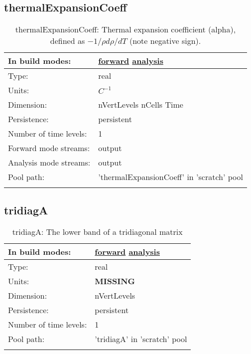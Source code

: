 \subsection[thermalExpansionCoeff]{thermalExpansionCoeff}
\label{subsec:var_sec_scratch_thermalExpansionCoeff}
\begin{center}
\begin{longtable}{| p{2.0in} | p{4.0in} |}
        \hline 
        In build modes: & \hyperref[subsec:forward_var_tab_scratch]{forward} \hyperref[subsec:analysis_var_tab_scratch]{analysis} \\
        \hline 
        Type: & real \\
        \hline 
        Units: & $C^{-1}$ \\
        \hline 
        Dimension: & nVertLevels nCells Time \\
        \hline 
        Persistence: & persistent \\
        \hline 
        Number of time levels: & 1 \\
        \hline 
		 Forward mode streams: &  output \\
        \hline 
		 Analysis mode streams: &  output \\
        \hline 
            Pool path: & 'thermalExpansionCoeff' in 'scratch' pool
 \\
		 \hline 
    \caption{thermalExpansionCoeff:  Thermal expansion coefficient (alpha), defined as  $-1/\rho d\rho/dT$  (note negative sign).}
\end{longtable}
\end{center}
\subsection[tridiagA]{tridiagA}
\label{subsec:var_sec_scratch_tridiagA}
\begin{center}
\begin{longtable}{| p{2.0in} | p{4.0in} |}
        \hline 
        In build modes: & \hyperref[subsec:forward_var_tab_scratch]{forward} \hyperref[subsec:analysis_var_tab_scratch]{analysis} \\
        \hline 
        Type: & real \\
        \hline 
        Units: & {\bf \color{red} MISSING} \\
        \hline 
        Dimension: & nVertLevels \\
        \hline 
        Persistence: & persistent \\
        \hline 
        Number of time levels: & 1 \\
        \hline 
            Pool path: & 'tridiagA' in 'scratch' pool
 \\
		 \hline 
    \caption{tridiagA: The lower band of a tridiagonal matrix}
\end{longtable}
\end{center}
